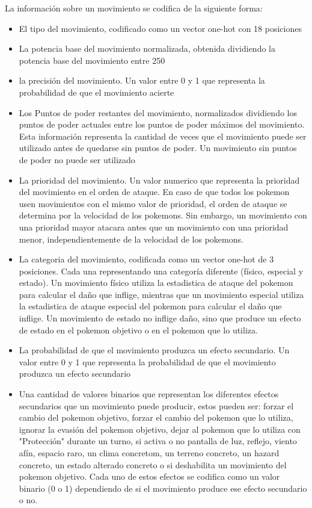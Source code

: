 \begin{itemize}
La información sobre un movimiento se codifica de la siguiente forma:
\begin{itemize}
    \item El tipo del movimiento, codificado como un vector one-hot con 18 posiciones
    \item La potencia base del movimiento normalizada, obtenida dividiendo la potencia base del movimiento entre 250 
    \item la precisión del movimiento. Un valor entre 0 y 1 que representa la probabilidad de que el movimiento acierte
    \item Los Puntos de poder restantes del movimiento, normalizados dividiendo los puntos de poder actuales entre los puntos de poder máximos del movimiento. Esta información representa la cantidad de veces que el movimiento puede ser utilizado antes de quedarse sin puntos de poder. Un movimiento sin puntos de poder no puede ser utilizado
    \item La prioridad del movimiento. Un valor numerico que representa la prioridad del movimiento en el orden de ataque. En caso de que todos los pokemon usen movimientos con el mismo valor de prioridad, el orden de ataque se determina por la velocidad de los pokemons. Sin embargo, un movimiento con una prioridad mayor atacara antes que un movimiento con una prioridad menor, independientemente de la velocidad de los pokemons.
    \item La categoria del movimiento, codificada como un vector one-hot de 3 posiciones. Cada una representando una categoría diferente (físico, especial y estado). Un movimiento físico utiliza la estadistica de ataque del pokemon para calcular el daño que inflige, mientras que un movimiento especial utiliza la estadistica de ataque especial del pokemon para calcular el daño que inflige. Un movimiento de estado no inflige daño, sino que produce un efecto de estado en el pokemon objetivo o en el pokemon que lo utiliza.
    \item La probabilidad de que el movimiento produzca un efecto secundario. Un valor entre 0 y 1 que representa la probabilidad de que el movimiento produzca un efecto secundario
    \item Una cantidad de valores binarios que representan los diferentes efectos secundarios que un movimiento puede producir, estos pueden ser: forzar el cambio del pokemon objetivo, forzar el cambio del pokemon que lo utiliza, ignorar la evasión del pokemon objetivo, dejar al pokemon que lo utiliza con "Protección" durante un turno, si activa o no pantalla de luz, reflejo, viento afín, espacio raro, un clima concretom, un terreno concreto, un hazard concreto, un estado alterado concreto o si deshabilita un movimiento del pokemon objetivo. Cada uno de estos efectos se codifica como un valor binario (0 o 1) dependiendo de si el movimiento produce ese efecto secundario o no.

\end{itemize}
\end{itemize}
